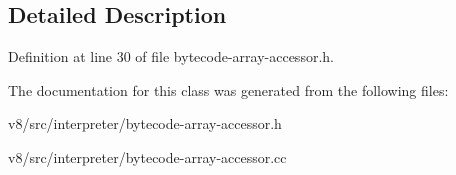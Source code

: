 \subsection{Detailed Description}


Definition at line 30 of file bytecode-\/array-\/accessor.\+h.



The documentation for this class was generated from the following files\+:\begin{DoxyCompactItemize}
\item 
v8/src/interpreter/bytecode-\/array-\/accessor.\+h\item 
v8/src/interpreter/bytecode-\/array-\/accessor.\+cc\end{DoxyCompactItemize}
